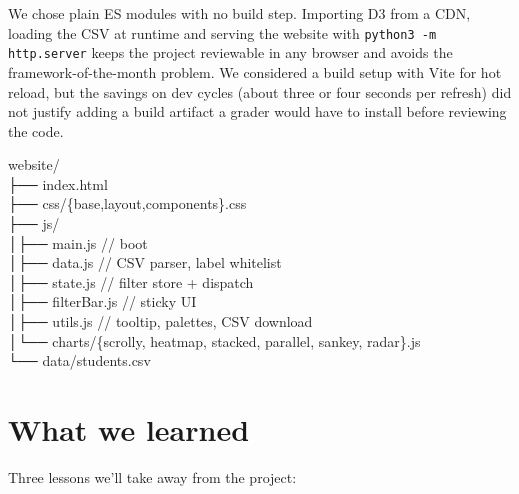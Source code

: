 \documentclass[11pt,a4paper]{article}
\newcommand{\code}[1]{\texttt{\small #1}}
\begin{document}
We chose plain ES modules with no build step. Importing D3 from a CDN, loading the CSV at runtime and serving the website with \code{python3 -m http.server} keeps the project reviewable in any browser and avoids the framework-of-the-month problem. We considered a build setup with Vite for hot reload, but the savings on dev cycles (about three or four seconds per refresh) did not justify adding a build artifact a grader would have to install before reviewing the code.

\begin{tcolorbox}[colback=paper,colframe=rule,leftrule=2pt,sharp corners,
                  fontupper=\footnotesize\ttfamily]
website/\\
\textcolor{muted}{├──} index.html\\
\textcolor{muted}{├──} css/\{base,layout,components\}.css\\
\textcolor{muted}{├──} js/\\
\textcolor{muted}{│\quad ├──} main.js            \textcolor{muted}{\rmfamily // boot}\\
\textcolor{muted}{│\quad ├──} data.js            \textcolor{muted}{\rmfamily // CSV parser, label whitelist}\\
\textcolor{muted}{│\quad ├──} state.js           \textcolor{muted}{\rmfamily // filter store + dispatch}\\
\textcolor{muted}{│\quad ├──} filterBar.js       \textcolor{muted}{\rmfamily // sticky UI}\\
\textcolor{muted}{│\quad ├──} utils.js           \textcolor{muted}{\rmfamily // tooltip, palettes, CSV download}\\
\textcolor{muted}{│\quad └──} charts/\{scrolly, heatmap, stacked, parallel, sankey, radar\}.js\\
\textcolor{muted}{└──} data/students.csv
\end{tcolorbox}

\section{What we learned}
\label{sec:lessons}

Three lessons we'll take away from the project:
\end{document}
